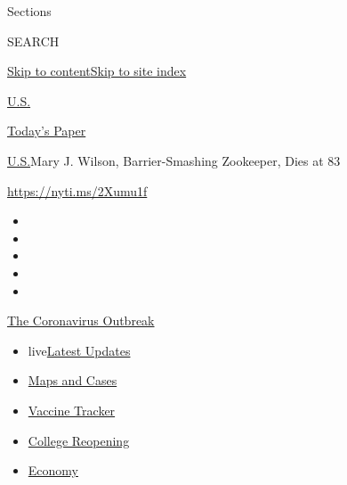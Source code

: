 Sections

SEARCH

\protect\hyperlink{site-content}{Skip to
content}\protect\hyperlink{site-index}{Skip to site index}

\href{https://www.nytimes3xbfgragh.onion/section/us}{U.S.}

\href{https://myaccount.nytimes3xbfgragh.onion/auth/login?response_type=cookie\&client_id=vi}{}

\href{https://www.nytimes3xbfgragh.onion/section/todayspaper}{Today's
Paper}

\href{/section/us}{U.S.}\textbar{}Mary J. Wilson, Barrier-Smashing
Zookeeper, Dies at 83

\url{https://nyti.ms/2Xumu1f}

\begin{itemize}
\item
\item
\item
\item
\item
\end{itemize}

\href{https://www.nytimes3xbfgragh.onion/news-event/coronavirus?action=click\&pgtype=Article\&state=default\&region=TOP_BANNER\&context=storylines_menu}{The
Coronavirus Outbreak}

\begin{itemize}
\tightlist
\item
  live\href{https://www.nytimes3xbfgragh.onion/2020/08/04/world/coronavirus-covid-19.html?action=click\&pgtype=Article\&state=default\&region=TOP_BANNER\&context=storylines_menu}{Latest
  Updates}
\item
  \href{https://www.nytimes3xbfgragh.onion/interactive/2020/us/coronavirus-us-cases.html?action=click\&pgtype=Article\&state=default\&region=TOP_BANNER\&context=storylines_menu}{Maps
  and Cases}
\item
  \href{https://www.nytimes3xbfgragh.onion/interactive/2020/science/coronavirus-vaccine-tracker.html?action=click\&pgtype=Article\&state=default\&region=TOP_BANNER\&context=storylines_menu}{Vaccine
  Tracker}
\item
  \href{https://www.nytimes3xbfgragh.onion/2020/08/02/us/covid-college-reopening.html?action=click\&pgtype=Article\&state=default\&region=TOP_BANNER\&context=storylines_menu}{College
  Reopening}
\item
  \href{https://www.nytimes3xbfgragh.onion/live/2020/08/03/business/stock-market-today-coronavirus?action=click\&pgtype=Article\&state=default\&region=TOP_BANNER\&context=storylines_menu}{Economy}
\end{itemize}

